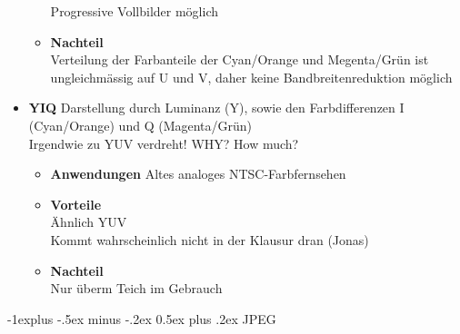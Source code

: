 \documentclass[10pt,landscape]{article}
\makeatletter
\renewcommand{\subsection}{\@startsection{subsection}{2}{0mm}%
                                {-1explus -.5ex minus -.2ex}%
                                {0.5ex plus .2ex}%
                                {\normalfont\normalsize\bfseries}}
\makeatother
\begin{document}
\begin{multicols}{3}
\begin{itemize}
\begin{itemize}
                Progressive Vollbilder m\"oglich
            \item \textbf{Nachteil} \\
                Verteilung der Farbanteile der Cyan/Orange und Megenta/Gr\"un ist ungleichm\"assig auf U und V, daher keine Bandbreitenreduktion m\"oglich
        \end{itemize}
    \item \textbf{YIQ}
        Darstellung durch Luminanz (Y), sowie den Farbdifferenzen I (Cyan/Orange) und Q (Magenta/Gr\"un) \\
        Irgendwie zu YUV verdreht! WHY? How much?
        \begin{itemize}
            \item \textbf{Anwendungen} Altes analoges NTSC-Farbfernsehen 
            \item \textbf{Vorteile} \\
                \"Ahnlich YUV \\
                Kommt wahrscheinlich nicht in der Klausur dran (Jonas)
            \item \textbf{Nachteil} \\
                Nur \"uberm Teich im Gebrauch
        \end{itemize}
\end{itemize}

\subsection{JPEG}

\end{multicols}
\end{document}
